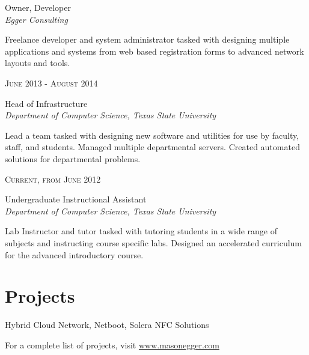 \documentclass[10pt]{article} %
\begin{document}
\begin{minipage}[t]{0.5\textwidth}
{\raggedright\large Owner, Developer\\
\textit{Egger Consulting}\\[5pt]}

\normalsize{Freelance developer and system administrator tasked with designing multiple applications and systems from web based registration forms to advanced network layouts and tools.}\\


{\raggedleft\textsc{June 2013 - August 2014}\par}

{\raggedright\large Head of Infrastructure\\
\textit{Department of Computer Science, Texas State University}\\[5pt]}

\normalsize{Lead a team tasked with designing new software and utilities for use by faculty, staff, and students. Managed multiple departmental servers. Created automated solutions for departmental problems.}\\


{\raggedleft\textsc{Current, from June 2012}\par}

{\raggedright\large Undergraduate Instructional Assistant\\
\textit{Department of Computer Science, Texas State University}\\[5pt]}

\normalsize{Lab Instructor and tutor tasked with tutoring students in a wide range of subjects and instructing course specific labs. Designed an accelerated curriculum for the advanced introductory course.}\\

\section{Projects}

{\raggedright\large Hybrid Cloud Network, Netboot, Solera NFC Solutions\\}

\normalsize{For a complete list of projects, visit \href{http://www.masonegger.com}{www.masonegger.com}}\\

\end{minipage} %
\end{document}
